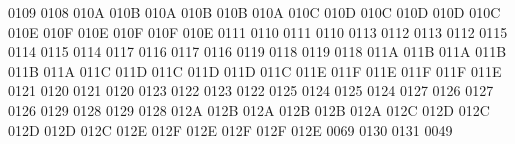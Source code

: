 0109 0108 %
\setcclcucx 010A 010B 010A %
\setcclcucx 010B 010B 010A %
\setcclcucx 010C 010D 010C %
\setcclcucx 010D 010D 010C %
\setcclcucx 010E 010F 010E %
\setcclcucx 010F 010F 010E %
 0111 0110 %
 0111 0110 %
 0113 0112 %
 0113 0112 %
 0115 0114 %
 0115 0114 %
 0117 0116 %
 0117 0116 %
 0119 0118 %
 0119 0118 %
\setcclcucx 011A 011B 011A %
\setcclcucx 011B 011B 011A %
\setcclcucx 011C 011D 011C %
\setcclcucx 011D 011D 011C %
\setcclcucx 011E 011F 011E %
\setcclcucx 011F 011F 011E %
 0121 0120 %
 0121 0120 %
 0123 0122 %
 0123 0122 %
 0125 0124 %
 0125 0124 %
 0127 0126 %
 0127 0126 %
 0129 0128 %
 0129 0128 %
\setcclcucx 012A 012B 012A %
\setcclcucx 012B 012B 012A %
\setcclcucx 012C 012D 012C %
\setcclcucx 012D 012D 012C %
\setcclcucx 012E 012F 012E %
\setcclcucx 012F 012F 012E %
 0069 0130 %
 0131 0049 %
